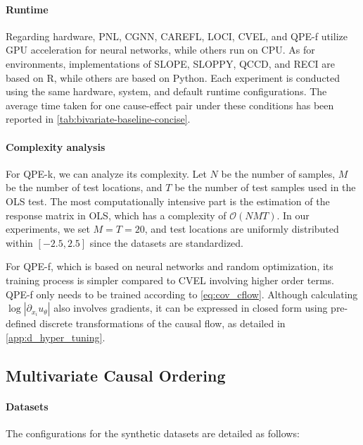 \documentclass{article}
\theoremstyle{plain}
\theoremstyle{definition}
\theoremstyle{remark}
\begin{document}
\paragraph{Runtime}

Regarding hardware, PNL, CGNN, CAREFL, LOCI, CVEL, and QPE-f utilize GPU acceleration for neural networks, while others run on CPU. As for environments, implementations of SLOPE, SLOPPY, QCCD, and RECI are based on R, while others are based on Python. Each experiment is conducted using the same hardware, system, and default runtime configurations. The average time taken for one cause-effect pair under these conditions has been reported in \cref{tab:bivariate-baseline-concise}.

\paragraph{Complexity analysis}

For QPE-k, we can analyze its complexity. Let $N$ be the number of samples, $M$ be the number of test locations, and $T$ be the number of test samples used in the OLS test. The most computationally intensive part is the estimation of the response matrix in OLS, which has a complexity of $\mathcal{O}(NMT)$. In our experiments, we set $M=T=20$, and test locations are uniformly distributed within $[-2.5,2.5]$ since the datasets are standardized.

For QPE-f, which is based on neural networks and random optimization, its training process is simpler compared to CVEL involving higher order terms. QPE-f only needs to be trained according to \cref{eq:cov_cflow}. Although calculating $\log |\partial_{x_i}u_\theta|$ also involves gradients, it can be expressed in closed form using pre-defined discrete transformations of the causal flow, as detailed in \cref{app:d_hyper_tuning}.%
\subsection{Multivariate Causal Ordering}
\label{app:c_multivariate}

\paragraph{Datasets}

The configurations for the synthetic datasets are detailed as follows:
\end{document}
